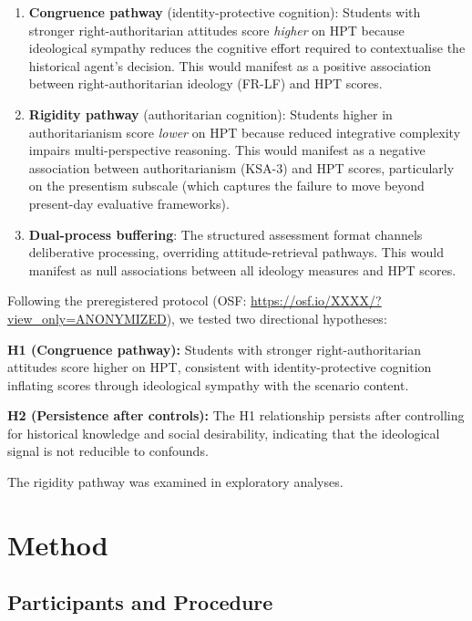 \documentclass[referee,pdflatex,sn-apa]{sn-jnl}
\begin{document}
\begin{enumerate}
\item \textbf{Congruence pathway} (identity-protective cognition): Students with stronger right-authoritarian attitudes score \textit{higher} on HPT because ideological sympathy reduces the cognitive effort required to contextualise the historical agent's decision. This would manifest as a positive association between right-authoritarian ideology (FR-LF) and HPT scores.

\item \textbf{Rigidity pathway} (authoritarian cognition): Students higher in authoritarianism score \textit{lower} on HPT because reduced integrative complexity impairs multi-perspective reasoning. This would manifest as a negative association between authoritarianism (KSA-3) and HPT scores, particularly on the presentism subscale (which captures the failure to move beyond present-day evaluative frameworks).

\item \textbf{Dual-process buffering}: The structured assessment format channels deliberative processing, overriding attitude-retrieval pathways. This would manifest as null associations between all ideology measures and HPT scores.
\end{enumerate}

Following the preregistered protocol (OSF: \url{https://osf.io/XXXX/?view_only=ANONYMIZED}), we tested two directional hypotheses:

\textbf{H1 (Congruence pathway):} Students with stronger right-authoritarian attitudes score higher on HPT, consistent with identity-protective cognition inflating scores through ideological sympathy with the scenario content.

\textbf{H2 (Persistence after controls):} The H1 relationship persists after controlling for historical knowledge and social desirability, indicating that the ideological signal is not reducible to confounds.

The rigidity pathway was examined in exploratory analyses.

\section{Method}\label{sec:method}

\subsection{Participants and Procedure}\label{subsec:participants}
\end{document}
